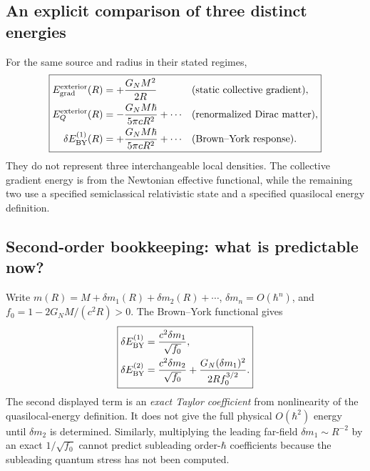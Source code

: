 \documentclass[11pt,a4paper]{article}
\theoremstyle{definition}\newtheorem{definition}[theorem]{Definition}
\theoremstyle{remark}\newtheorem{remark}[theorem]{Remark}
\begin{document}
\subsection{An explicit comparison of three distinct energies}
For the same source and radius in their stated regimes,
\begin{equation}\label{eq:v15-energytriangle}
\boxed{\begin{aligned}
 E_{\rm grad}^{\rm exterior}(R)&=+\frac{G_NM^2}{2R}
 &&\text{(static collective gradient)},\\
 E_Q^{\rm exterior}(R)&=-\frac{G_NM\hbar}{5\pi cR^2}+\cdots
 &&\text{(renormalized Dirac matter)},\\
 \delta E_{\rm BY}^{(1)}(R)&=+\frac{G_NM\hbar}{5\pi cR^2}+\cdots
 &&\text{(Brown--York response)}.
\end{aligned}}
\end{equation}
They do not represent three interchangeable local densities. The
collective gradient energy is from the Newtonian effective functional,
while the remaining two use a specified semiclassical relativistic
state and a specified quasilocal energy definition.

\subsection{Second-order bookkeeping: what is predictable now?}
Write $m(R)=M+\delta m_1(R)+\delta m_2(R)+\cdots$,
$\delta m_n=O(\hbar^n)$, and
$f_0=1-2G_NM/(c^2R)>0$. The Brown--York functional gives
\begin{equation}\label{eq:v15-bytaylor}
 \boxed{\begin{aligned}
 \delta E_{\rm BY}^{(1)}&=\frac{c^2\delta m_1}{\sqrt{f_0}},\\
 \delta E_{\rm BY}^{(2)}&=\frac{c^2\delta m_2}{\sqrt{f_0}}
 +\frac{G_N(\delta m_1)^2}{2R f_0^{3/2}}.
 \end{aligned}}
\end{equation}
The second displayed term is an \emph{exact Taylor coefficient} from
nonlinearity of the quasilocal-energy definition. It does not give the
full physical $O(\hbar^2)$ energy until $\delta m_2$ is determined.
Similarly, multiplying the leading far-field $\delta m_1\sim R^{-2}$
by an exact $1/\sqrt{f_0}$ cannot predict subleading order-$\hbar$
coefficients because the subleading quantum stress has not been computed.
\end{document}
